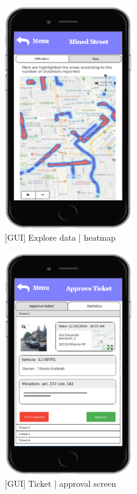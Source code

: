 \begin{figure}[h]
		\centering
      \includegraphics[width=0.5\textwidth]{GUI/MinedStreet.png}
      \caption{[GUI] Explore data | heatmap}   \label{fig:MinedStreet}
\end{figure}

\begin{figure}[h]
		\centering
      \includegraphics[width=0.5\textwidth]{GUI/Ticket.png}
      \caption{[GUI] Ticket | approval screen}   \label{fig:Ticket}
\end{figure}
